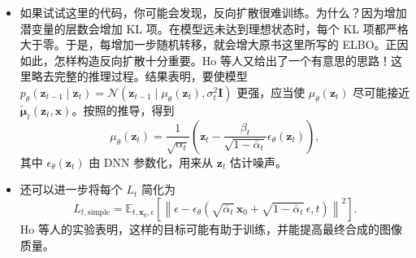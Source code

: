 \begin{itemize}
\begin{equation}
\begin{aligned}
 &+\underbrace{-\log p_\theta(\mathbf{x}\mid\mathbf{z}_1)}_{L_0}\Biggr].
\end{aligned}
\tag{5.102}\label{eq:05-102}
\end{equation}
现在，无需对目标函数的所有组成部分求导，可以随机选取一个 $L_t$ 作为目标。这样做的明显好处是不用把所有梯度都保存在内存里，每次只更新一层。我们的训练本来就是随机的，通常使用随机梯度下降，因此训练时可以引入这种额外的随机性。其好处很大，我们就能训练极深的模型，甚至像那样训练 1000 层的模型。
\item 如果试试这里的代码，你可能会发现，反向扩散很难训练。为什么？因为增加潜变量的层数会增加 KL 项。在模型远未达到理想状态时，每个 KL 项都严格大于零。于是，每增加一步随机转移，就会增大原书这里所写的 ELBO。正因如此，怎样构造反向扩散十分重要。Ho 等人又给出了一个有意思的思路！这里略去完整的推理过程。结果表明，要使模型 $p_\theta(\mathbf{z}_{t-1}\mid\mathbf{z}_t)=\mathcal{N}(\mathbf{z}_{t-1}\mid\mu_\theta(\mathbf{z}_t),\sigma_t^2\mathbf{I})$ 更强，应当使 $\mu_\theta(\mathbf{z}_t)$ 尽可能接近 $\tilde{\boldsymbol{\mu}}_t(\mathbf{z}_t,\mathbf{x})$。按照的推导，得到
\[
\mu_\theta(\mathbf{z}_t)=\frac{1}{\sqrt{\alpha_t}}\left(
 \mathbf{z}_t-\frac{\beta_t}{\sqrt{1-\bar\alpha_t}}\epsilon_\theta(\mathbf{z}_t)\right),
\]
其中 $\epsilon_\theta(\mathbf{z}_t)$ 由 DNN 参数化，用来从 $\mathbf{z}_t$ 估计噪声。
\item 还可以进一步将每个 $L_t$ 简化为
\[
L_{t,\mathrm{simple}}=\mathbb{E}_{t,\mathbf{x}_0,\epsilon}\left[
 \left\|\epsilon-\epsilon_\theta\left(
    \sqrt{\bar\alpha_t}\,\mathbf{x}_0+\sqrt{1-\bar\alpha_t}\,\epsilon,t\right)
 \right\|^2\right].
\]
Ho 等人的实验表明，这样的目标可能有助于训练，并能提高最终合成的图像质量。
\end{itemize}

